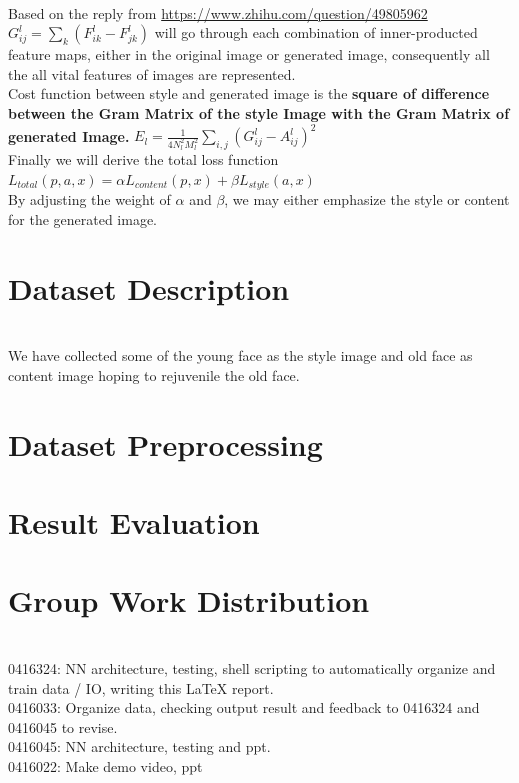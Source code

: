 \documentclass[11pt, a4paper]{article} %
\begin{document}
\\ Based on the reply from \url{https://www.zhihu.com/question/49805962}
\\ $G^{l}_{ij} = \sum_{k}(F^{l}_{ik} - F^l_{jk})$ will go through each combination of inner-producted feature maps, either in the original image or generated image, consequently all the all vital features of images are represented.
\\ Cost function between style and generated image is the \textbf{square of difference between the Gram Matrix of the style Image with the Gram Matrix of generated Image.} $E_{l} = \frac{1}{4N^{2}_{l}M^2_{l}} \sum_{i, j}(G^{l}_{ij} - A^l_{ij})^2$
\\ Finally we will derive the total loss function $L_{total}(p, a, x) = \alpha L_{content}(p, x) + \beta L_{style}(a, x)$
\\ By adjusting the weight of $\alpha$ and $\beta$, we may either emphasize the style or content for the generated image.

\section{Dataset Description}
\\ We have collected some of the young face as the style image and old face as content image hoping to rejuvenile the old face. 
\section{Dataset Preprocessing}
\section{Result Evaluation}
\section{Group Work Distribution}
\\ 0416324: NN architecture, testing, shell scripting to automatically organize and train data / IO, writing this LaTeX report.
\\ 0416033: Organize data, checking output result and feedback to 0416324 and 0416045 to revise.
\\ 0416045: NN architecture, testing and ppt.
\\ 0416022: Make demo video, ppt
\end{document}
